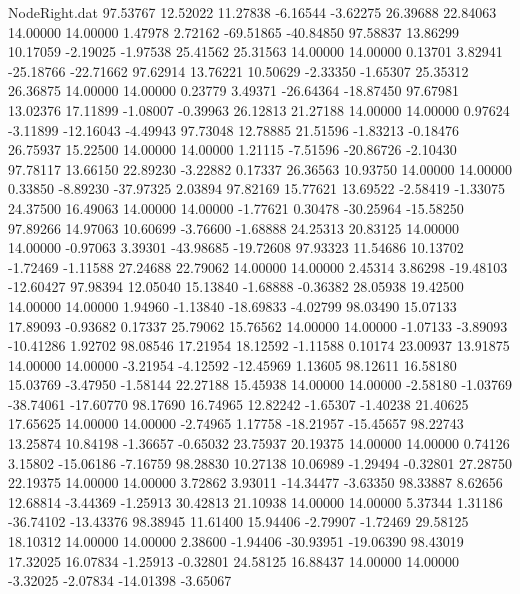 \begin{filecontents}{NodeRight.dat}
  97.53767   12.52022   11.27838    -6.16544   -3.62275   26.39688   22.84063   14.00000   14.00000    1.47978    2.72162  -69.51865  -40.84850
  97.58837   13.86299   10.17059    -2.19025   -1.97538   25.41562   25.31563   14.00000   14.00000    0.13701    3.82941  -25.18766  -22.71662
  97.62914   13.76221   10.50629    -2.33350   -1.65307   25.35312   26.36875   14.00000   14.00000    0.23779    3.49371  -26.64364  -18.87450
  97.67981   13.02376   17.11899    -1.08007   -0.39963   26.12813   21.27188   14.00000   14.00000    0.97624   -3.11899  -12.16043   -4.49943
  97.73048   12.78885   21.51596    -1.83213   -0.18476   26.75937   15.22500   14.00000   14.00000    1.21115   -7.51596  -20.86726   -2.10430
  97.78117   13.66150   22.89230    -3.22882    0.17337   26.36563   10.93750   14.00000   14.00000    0.33850   -8.89230  -37.97325    2.03894
  97.82169   15.77621   13.69522    -2.58419   -1.33075   24.37500   16.49063   14.00000   14.00000   -1.77621    0.30478  -30.25964  -15.58250
  97.89266   14.97063   10.60699    -3.76600   -1.68888   24.25313   20.83125   14.00000   14.00000   -0.97063    3.39301  -43.98685  -19.72608
  97.93323   11.54686   10.13702    -1.72469   -1.11588   27.24688   22.79062   14.00000   14.00000    2.45314    3.86298  -19.48103  -12.60427
  97.98394   12.05040   15.13840    -1.68888   -0.36382   28.05938   19.42500   14.00000   14.00000    1.94960   -1.13840  -18.69833   -4.02799
  98.03490   15.07133   17.89093    -0.93682    0.17337   25.79062   15.76562   14.00000   14.00000   -1.07133   -3.89093  -10.41286    1.92702
  98.08546   17.21954   18.12592    -1.11588    0.10174   23.00937   13.91875   14.00000   14.00000   -3.21954   -4.12592  -12.45969    1.13605
  98.12611   16.58180   15.03769    -3.47950   -1.58144   22.27188   15.45938   14.00000   14.00000   -2.58180   -1.03769  -38.74061  -17.60770
  98.17690   16.74965   12.82242    -1.65307   -1.40238   21.40625   17.65625   14.00000   14.00000   -2.74965    1.17758  -18.21957  -15.45657
  98.22743   13.25874   10.84198    -1.36657   -0.65032   23.75937   20.19375   14.00000   14.00000    0.74126    3.15802  -15.06186   -7.16759
  98.28830   10.27138   10.06989    -1.29494   -0.32801   27.28750   22.19375   14.00000   14.00000    3.72862    3.93011  -14.34477   -3.63350
  98.33887    8.62656   12.68814    -3.44369   -1.25913   30.42813   21.10938   14.00000   14.00000    5.37344    1.31186  -36.74102  -13.43376
  98.38945   11.61400   15.94406    -2.79907   -1.72469   29.58125   18.10312   14.00000   14.00000    2.38600   -1.94406  -30.93951  -19.06390
  98.43019   17.32025   16.07834    -1.25913   -0.32801   24.58125   16.88437   14.00000   14.00000   -3.32025   -2.07834  -14.01398   -3.65067

\end{filecontents}
